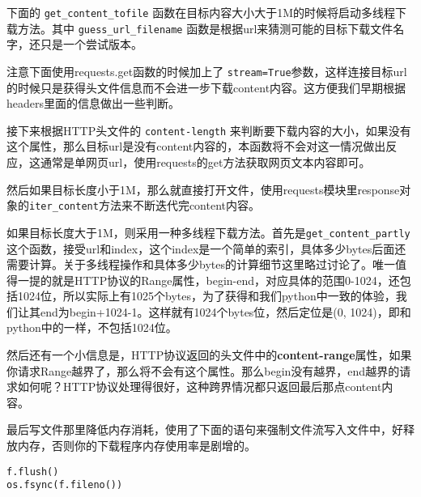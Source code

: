 \documentclass[12pt,oneside]{book}
\begin{document}
\begin{common-format}
下面的 \verb+get_content_tofile+ 函数在目标内容大小大于1M的时候将启动多线程下载方法。其中 \verb+guess_url_filename+ 函数是根据url来猜测可能的目标下载文件名字，还只是一个尝试版本。

注意下面使用requests.get函数的时候加上了 \verb+stream=True+参数，这样连接目标url的时候只是获得头文件信息而不会进一步下载content内容。这方便我们早期根据headers里面的信息做出一些判断。

接下来根据HTTP头文件的 \verb+content-length+ 来判断要下载内容的大小，如果没有这个属性，那么目标url是没有content内容的，本函数将不会对这一情况做出反应，这通常是单网页url，使用requests的get方法获取网页文本内容即可。

然后如果目标长度小于1M，那么就直接打开文件，使用requests模块里response对象的\verb+iter_content+方法来不断迭代完content内容。

如果目标长度大于1M，则采用一种多线程下载方法。首先是\verb+get_content_partly+这个函数，接受url和index，这个index是一个简单的索引，具体多少bytes后面还需要计算。关于多线程操作和具体多少bytes的计算细节这里略过讨论了。唯一值得一提的就是HTTP协议的Range属性，begin-end，对应具体的范围0-1024，还包括1024位，所以实际上有1025个bytes，为了获得和我们python中一致的体验，我们让其end为begin+1024-1。这样就有1024个bytes位，然后定位是(0, 1024)，即和python中的一样，不包括1024位。

然后还有一个小信息是，HTTP协议返回的头文件中的\textbf{content-range}属性，如果你请求Range越界了，那么将不会有这个属性。那么begin没有越界，end越界的请求如何呢？HTTP协议处理得很好，这种跨界情况都只返回最后那点content内容。

最后写文件那里降低内存消耗，使用了下面的语句来强制文件流写入文件中，好释放内存，否则你的下载程序内存使用率是剧增的。
\begin{Verbatim}
f.flush()
os.fsync(f.fileno())
\end{Verbatim}


\end{common-format}
\end{document}
